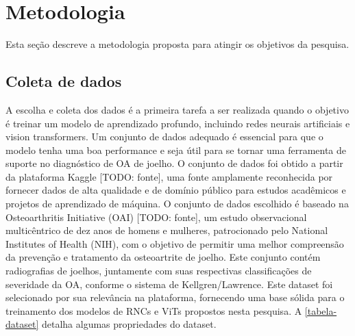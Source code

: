 \chapter{Metodologia}\label{cap:proposta}

Esta seção descreve a metodologia proposta para atingir os objetivos da pesquisa.

\section{Coleta de dados}

A escolha e coleta dos dados é a primeira tarefa a ser realizada quando o objetivo é treinar um modelo de aprendizado profundo, incluindo redes neurais artificiais e vision transformers. Um conjunto de dados adequado é essencial para que o modelo tenha uma boa performance e seja útil para se tornar uma ferramenta de suporte no diagnóstico de OA de joelho. O conjunto de dados foi obtido a partir da plataforma Kaggle [TODO: fonte], uma fonte amplamente reconhecida por fornecer dados de alta qualidade e de domínio público para estudos acadêmicos e projetos de aprendizado de máquina. O conjunto de dados escolhido é baseado na Osteoarthritis Initiative (OAI) [TODO: fonte], um estudo observacional multicêntrico de dez anos de homens e mulheres, patrocionado pelo National Institutes of Health (NIH), com o objetivo de permitir uma melhor compreensão da prevenção e tratamento da osteoartrite de joelho. Este conjunto contém radiografias de joelhos, juntamente com suas respectivas classificações de severidade da OA, conforme o sistema de Kellgren/Lawrence. Este dataset foi selecionado por sua relevância na plataforma, fornecendo uma base sólida para o treinamento dos modelos de RNCs e ViTs propostos nesta pesquisa. A \autoref{tabela-dataset} detalha algumas propriedades do dataset.

